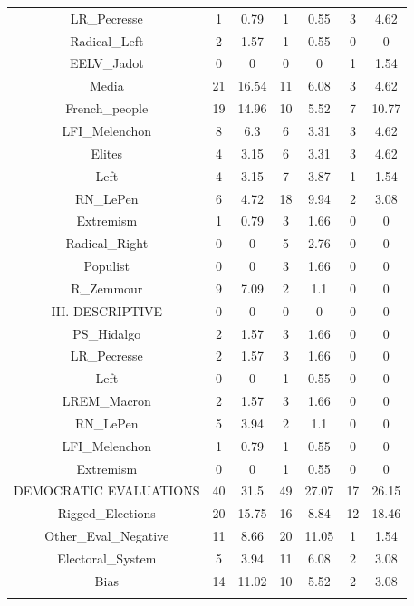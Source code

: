 \begin{table}[!htbp]
\begin{tabular}{@{\extracolsep{0.01pt}} ccccccc}
LR\_Pecresse & 1 & 0.79 & 1 & 0.55 & 3 & 4.62 \\ 
Radical\_Left & 2 & 1.57 & 1 & 0.55 & 0 & 0 \\ 
EELV\_Jadot & 0 & 0 & 0 & 0 & 1 & 1.54 \\ 
Media & 21 & 16.54 & 11 & 6.08 & 3 & 4.62 \\ 
French\_people & 19 & 14.96 & 10 & 5.52 & 7 & 10.77 \\ 
LFI\_Melenchon & 8 & 6.3 & 6 & 3.31 & 3 & 4.62 \\ 
Elites & 4 & 3.15 & 6 & 3.31 & 3 & 4.62 \\ 
Left & 4 & 3.15 & 7 & 3.87 & 1 & 1.54 \\ 
RN\_LePen & 6 & 4.72 & 18 & 9.94 & 2 & 3.08 \\ 
Extremism & 1 & 0.79 & 3 & 1.66 & 0 & 0 \\ 
Radical\_Right & 0 & 0 & 5 & 2.76 & 0 & 0 \\ 
Populist & 0 & 0 & 3 & 1.66 & 0 & 0 \\ 
R\_Zemmour & 9 & 7.09 & 2 & 1.1 & 0 & 0 \\ 
III. DESCRIPTIVE & 0 & 0 & 0 & 0 & 0 & 0 \\ 
PS\_Hidalgo & 2 & 1.57 & 3 & 1.66 & 0 & 0 \\ 
LR\_Pecresse & 2 & 1.57 & 3 & 1.66 & 0 & 0 \\ 
Left & 0 & 0 & 1 & 0.55 & 0 & 0 \\ 
LREM\_Macron & 2 & 1.57 & 3 & 1.66 & 0 & 0 \\ 
RN\_LePen & 5 & 3.94 & 2 & 1.1 & 0 & 0 \\ 
LFI\_Melenchon & 1 & 0.79 & 1 & 0.55 & 0 & 0 \\ 
Extremism & 0 & 0 & 1 & 0.55 & 0 & 0 \\ 
DEMOCRATIC EVALUATIONS & 40 & 31.5 & 49 & 27.07 & 17 & 26.15 \\ 
Rigged\_Elections & 20 & 15.75 & 16 & 8.84 & 12 & 18.46 \\ 
Other\_Eval\_Negative & 11 & 8.66 & 20 & 11.05 & 1 & 1.54 \\ 
Electoral\_System & 5 & 3.94 & 11 & 6.08 & 2 & 3.08 \\ 
Bias & 14 & 11.02 & 10 & 5.52 & 2 & 3.08 \\ 
\hline \\[-1.8ex] 
\end{tabular} 
\end{table} 
